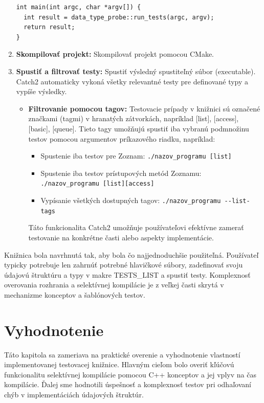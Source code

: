 \documentclass[11pt]{article}
\begin{document}
\begin{enumerate}
\begin{lstlisting}
int main(int argc, char *argv[]) {
  int result = data_type_probe::run_tests(argc, argv);
  return result;
}
\end{lstlisting}
\item \textbf{Skompilovať projekt:} Skompilovať projekt pomocou CMake.
\item \textbf{Spustiť a filtrovať testy:} Spustiť výsledný spustiteľný súbor (executable). Catch2 automaticky vykoná všetky relevantné testy pre definované typy a vypíše výsledky.
  \begin{itemize}
    \item \textbf{Filtrovanie pomocou tagov:} Testovacie prípady v knižnici sú označené značkami (tagmi) v hranatých zátvorkách, napríklad [list], [access], [basic], [queue]. Tieto tagy umožňujú spustiť iba vybranú podmnožinu testov pomocou argumentov príkazového riadku, napríklad:
    \begin{itemize}
      \item Spustenie iba testov pre Zoznam: \lstinline|./nazov_programu [list]|
      \item Spustenie iba testov prístupových metód Zoznamu: \lstinline|./nazov_programu [list][access]|
      \item Vypísanie všetkých dostupných tagov: \lstinline|./nazov_programu --list-tags|
    \end{itemize}
    Táto funkcionalita Catch2 umožňuje používateľovi efektívne zamerať testovanie na konkrétne časti alebo aspekty implementácie.
  \end{itemize}
\end{enumerate}

Knižnica bola navrhnutá tak, aby bola čo najjednoduchšie použiteľná. Používateľ typicky potrebuje len zahrnúť potrebné hlavičkové súbory, zadefinovať svoju údajovú štruktúru a typy v makre TESTS\_LIST a spustiť testy. Komplexnosť overovania rozhrania a selektívnej kompilácie je z veľkej časti skrytá v mechanizme konceptov a šablónových testov.

\newpage
\section{Vyhodnotenie} \label{sec:vyhodnotenie}

Táto kapitola sa zameriava na praktické overenie a vyhodnotenie vlastností implementovanej testovacej knižnice. Hlavným cieľom bolo overiť kľúčovú funkcionalitu selektívnej kompilácie pomocou C++ konceptov a jej vplyv na čas kompilácie. Ďalej sme hodnotili úspešnosť a komplexnosť testov pri odhaľovaní chýb v implementáciách údajových štruktúr.
\end{document}
